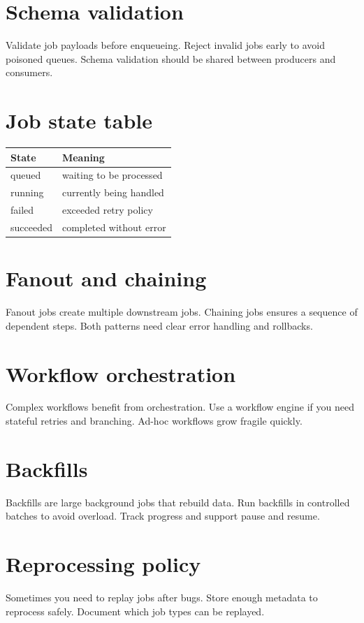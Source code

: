 \section{Schema validation}
Validate job payloads before enqueueing.
Reject invalid jobs early to avoid poisoned queues.
Schema validation should be shared between producers and consumers.

\section{Job state table}
\begin{tabularx}{\textwidth}{@{}lX@{}}
\toprule
State & Meaning \\
\midrule
queued & waiting to be processed \\
running & currently being handled \\
failed & exceeded retry policy \\
succeeded & completed without error \\
\bottomrule
\end{tabularx}

\section{Fanout and chaining}
Fanout jobs create multiple downstream jobs.
Chaining jobs ensures a sequence of dependent steps.
Both patterns need clear error handling and rollbacks.

\section{Workflow orchestration}
Complex workflows benefit from orchestration.
Use a workflow engine if you need stateful retries and branching.
Ad-hoc workflows grow fragile quickly.

\section{Backfills}
Backfills are large background jobs that rebuild data.
Run backfills in controlled batches to avoid overload.
Track progress and support pause and resume.

\section{Reprocessing policy}
Sometimes you need to replay jobs after bugs.
Store enough metadata to reprocess safely.
Document which job types can be replayed.

